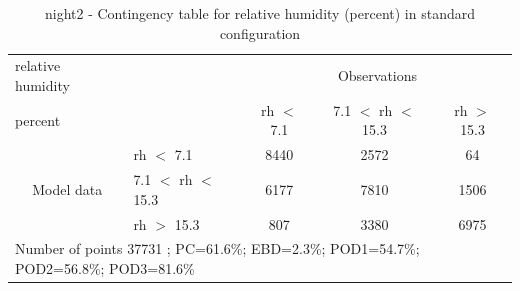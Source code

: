 \begin{table}[p!]
\begin{center}
\begin{tabular}{llccc}
\hline
{relative humidity}                                       &                                                    & \multicolumn{3}{c}{Observations}                 \\
{percent}                                       &                             & rh $<$ 7.1   & 7.1 $<$ rh $<$ 15.3 & rh $>$ 15.3 \\
\hline
\multicolumn{1}{c}{\multirow{3}{*}{Model data}}  & rh $<$ 7.1             & 8440                & 2572                       & 64              \\
                                                 & 7.1  $<$ rh $<$ 15.3 & 6177                & 7810                       & 1506              \\
                                                 & rh $>$ 15.3             & 807                & 3380                       & 6975              \\
\hline
\multicolumn{5}{l}{ Number of points        37731 ; PC=61.6\%; EBD=2.3\%; POD1=54.7\%; POD2=56.8\%; POD3=81.6\%}
\end{tabular}
\end{center}
\caption{night2 - Contingency table for  relative humidity (percent) in standard configuration}
\label{tab:contingencyrhBEF:night2}
\end{table}
